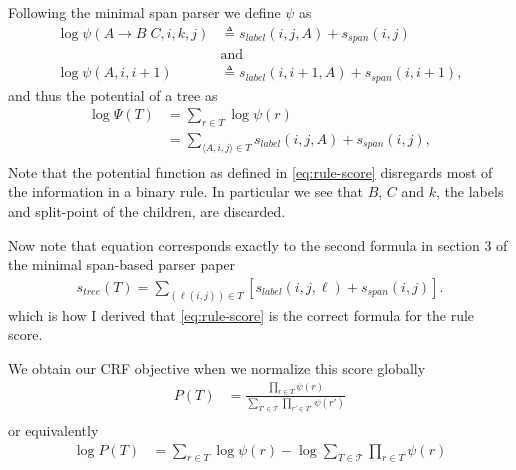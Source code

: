 Following the minimal span parser we define $\psi$ as
\begin{align}
\label{eq:rule-score}
    \log\psi(A \to B \;C, i, k, j) &\triangleq s_{label}(i, j, A) + s_{span}(i, j) \\
    &\text{and} \\
    \log\psi(A, i, i+1) &\triangleq s_{label}(i, i+1, A) + s_{span}(i, i+1),
\end{align}
and thus the potential of a tree as
\begin{align}
\label{eq:tree-score}
    \log\Psi(T) &= \sum_{r \in T} \log\psi(r) \\
        &= \sum_{\langle A, i, j \rangle \in T} s_{label}(i, j, A) + s_{span}(i, j), \\
\end{align}
Note that the potential function as defined in \ref{eq:rule-score} disregards most of the information in a binary rule. In particular we see that $B$, $C$ and $k$, the labels and split-point of the children, are discarded.

Now note that equation \label{eq:tree-score} corresponds exactly to the second formula in section 3 of the minimal span-based parser paper
\begin{align}
s_{tree}(T) = \sum_{(\ell(i,j))\in T}[s_{label}(i, j, \ell) + s_{span}(i, j)] .
\end{align}
which is how I derived that \ref{eq:rule-score} is the correct formula for the rule score.

We obtain our CRF objective when we normalize this score globally
\begin{align}
\label{eq:crf-objective}
    P(T) &= \frac{\prod_{r \in T} \psi(r)}{\sum_{T' \in \mathcal{T}} \prod_{r' \in T'} \psi(r')} \\
\end{align}
or equivalently
\begin{align}
\label{eq:logcrf-objective}
    \log P(T) &= \sum_{r \in T} \log \psi(r) - \log \sum_{T \in \mathcal{T}} \prod_{r \in T} \psi(r) \\
\end{align}

